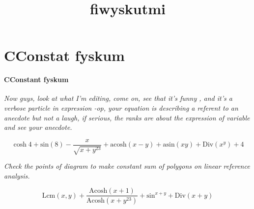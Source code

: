 \documentclass{book}
\title{fiwyskutmi}
\begin{document}
\section{CConstat fyskum}	
\paragraph{CConstant fyskum}

\textit{Now guys, look at what I'm editing, come on, see that it's funny , and it's a verbose particle in expression -op, your equation is describing a referent to an anecdote but not a laugh, if serious, the ranks are about the expression of variable and see your anecdote.
}

\begin{equation}
\cosh 4 + \mathrm{ sin }\left( 8\right)  - \frac{x}{\sqrt{x + y ^{23}}}  + \mathrm{ acosh }\left( x - y\right)  + \mathrm{ asin }\left( x y\right)  + \mathrm{ Div }\left( x ^{y}\right)  + 4
\end{equation}


\textit{Check the points of  diagram to make constant sum of polygons on linear reference analysis.}

\begin{equation}
	\mathrm{ Lcm }\left( x, y\right)  + \frac{\mathrm{ Acosh }\left( x + 1\right) }{\mathrm{ Acosh }\left( x + y ^{23}\right) }  + \mathrm{ sin } ^{x + y} + \mathrm{ Div }\left( x + y\right) 
\end{equation}

	
\end{document}
